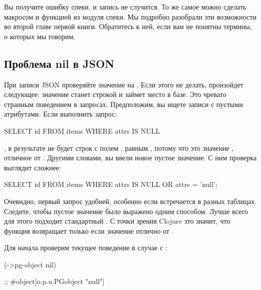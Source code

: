 Вы получите ошибку спеки, и запись не случится. То же самое можно сделать макросом  и функцией  из модуля спеки. Мы подробно разобрали эти возможности во второй главе первой книги. Обратитесь к ней, если вам не понятны термины, о которых мы говорим.

\subsection{Проблема nil в JSON}


При записи JSON проверяйте значение на . Если этого не делать, произойдет следующее: значение  станет строкой  и займет место в базе. Это чревато странным поведением в запросах. Предположим, вы ищете записи с пустыми атрибутами. Если выполнить запрос:

\begin{english}
  \begin{sql}
SELECT id FROM items WHERE attrs IS NULL
  \end{sql}
\end{english}

\noindent
, в результате не будет строк с полем , равным , потому что это значение , отличное от . Другими словами, вы ввели новое пустое значение. С ним проверка выглядит сложнее:

\begin{english}
  \begin{sql}
SELECT id FROM items
WHERE attrs IS NULL OR attrs = 'null';
  \end{sql}
\end{english}

Очевидно, первый запрос удобней, особенно если  встречается в разных таблицах. Следите, чтобы пустое значение было выражено одним способом. Лучше всего для этого подходит стандартный . С точки зрения Clojure это значит, что функция  возвращает  только если значение отлично от .

Для начала проверим текущее поведение в случае с :

\begin{english}
  \begin{clojure}
(->pg-object nil)

;; #object[o.p.u.PGobject "null"]
  \end{clojure}
\end{english}

